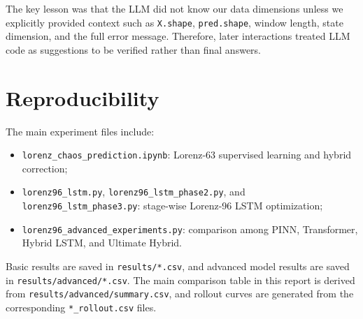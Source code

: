 \documentclass[a4paper,12pt]{article}
\begin{document}
The key lesson was that the LLM did not know our data dimensions unless we explicitly provided context such as \texttt{X.shape}, \texttt{pred.shape}, window length, state dimension, and the full error message. Therefore, later interactions treated LLM code as suggestions to be verified rather than final answers.

\section{Reproducibility}

The main experiment files include:
\begin{itemize}
    \item \texttt{lorenz\_chaos\_prediction.ipynb}: Lorenz-63 supervised learning and hybrid correction;
    \item \texttt{lorenz96\_lstm.py}, \texttt{lorenz96\_lstm\_phase2.py}, and \texttt{lorenz96\_lstm\_phase3.py}: stage-wise Lorenz-96 LSTM optimization;
    \item \texttt{lorenz96\_advanced\_experiments.py}: comparison among PINN, Transformer, Hybrid LSTM, and Ultimate Hybrid.
\end{itemize}
Basic results are saved in \texttt{results/*.csv}, and advanced model results are saved in \texttt{results/advanced/*.csv}. The main comparison table in this report is derived from \texttt{results/advanced/summary.csv}, and rollout curves are generated from the corresponding \texttt{*\_rollout.csv} files.
\end{document}
